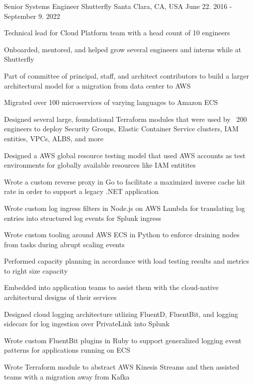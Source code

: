\begin{cventries}
  \cventry
    {Senior Systems Engineer} %
    {Shutterfly} %
    {Santa Clara, CA, USA} %
    {June 22. 2016 - September 9. 2022} %
    {
      \begin{cvitems}
        \item {Technical lead for Cloud Platform team with a head count of 10 engineers}
        \item {Onboarded, mentored, and helped grow several engineers and interns while at Shutterfly}
        \item {Part of committee of principal, staff, and architect contributors to build a larger architectural model for a migration from data center to AWS}
        \item {Migrated over 100 microservices of varying languages to Amazon ECS}
        \item {Designed several large, foundational Terraform modules that were used by ~200 engineers to deploy Security Groups, Elastic Container Service clusters, IAM entities, VPCs, ALBS, and more}
        \item {Designed a AWS global resource testing model that used AWS accounts as test environments for globally available resources like IAM entitites}
        \item {Wrote a custom reverse proxy in Go to facilitate a maximized inverse cache hit rate in order to support a legacy .NET application}
        \item {Wrote custom log ingress filters in Node.js on AWS Lambda for translating log entries into structured log events for Splunk ingress}
        \item {Wrote custom tooling around AWS ECS in Python to enforce draining nodes from tasks during abrupt scaling events}
        \item {Performed capacity planning in accordance with load testing results and metrics to right size capacity}
        \item {Embedded into application teams to assist them with the cloud-native architectural designs of their services}
        \item {Designed cloud logging architecture utlizing FluentD, FluentBit, and logging sidecars for log ingestion over PrivateLink into Splunk}
        \item Wrote custom FluentBit plugins in Ruby to support generalized logging event patterns for applications running on ECS
        \item {Wrote Terraform module to abstract AWS Kinesis Streams and then assisted teams with a migration away from Kafka}

\end{cvitems}}
\end{cventries}
